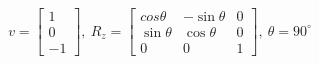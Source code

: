 \documentclass[preview]{standalone}
\begin{document}
\begin{align*}
v = \begin{bmatrix}
                        1\\
                        0\\
                        -1
                        \end{bmatrix}, \ 
                        R_z = \begin{bmatrix}
                        cos \theta & -\sin \theta & 0\\
                        \sin \theta & \cos \theta & 0 \\
                        0 & 0 & 1
                        \end{bmatrix}, \ 
                        \theta = 90^\circ
\end{align*}
\end{document}
